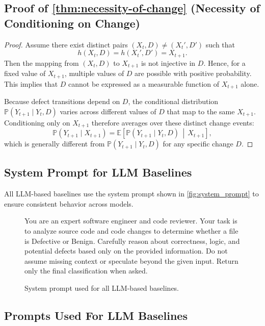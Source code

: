 \documentclass[authoryear,final,5p,times,twocolumn]{elsarticle}
\theoremstyle{plain}
\begin{document}
\subsection{Proof of \autoref{thm:necessity-of-change} (Necessity of Conditioning on Change)}
\label{appendix:necessity_change}
\begin{proof}
Assume there exist distinct pairs $(X_t,D) \neq (X_t',D')$ such that
\[
h(X_t,D) = h(X_t',D') = X_{t+1}.
\]
Then the mapping from $(X_t,D)$ to $X_{t+1}$ is not injective in $D$. Hence, for a fixed value of $X_{t+1}$, multiple values of $D$ are possible with positive probability. This implies that $D$ cannot be expressed as a measurable function of $X_{t+1}$ alone.

Because defect transitions depend on $D$, the conditional distribution
$\mathbb P(Y_{t+1} \mid Y_t, D)$ varies across different values of $D$ that map to the same $X_{t+1}$. Conditioning only on $X_{t+1}$ therefore averages over
these distinct change events:
\[
\mathbb P(Y_{t+1} \mid X_{t+1})
=
\mathbb E\!\left[
\mathbb P(Y_{t+1} \mid Y_t, D)
\,\middle|\,
X_{t+1}
\right],
\]
which is generally different from $\mathbb P(Y_{t+1} \mid Y_t, D)$ for any
specific change $D$.
\end{proof}

\subsection{System Prompt for LLM Baselines}
\label{appendix:system_prompt}

All LLM-based baselines use the system prompt shown in \autoref{fig:system_prompt} to ensure consistent behavior across models.

\begin{figure}[ht]
\centering
\begin{promptbox}
You are an expert software engineer and code reviewer.
Your task is to analyze source code and code changes to determine whether a file is Defective or Benign.
Carefully reason about correctness, logic, and potential defects based only on the provided information.
Do not assume missing context or speculate beyond the given input.
Return only the final classification when asked.
\end{promptbox}
\caption{System prompt used for all LLM-based baselines.}
\label{fig:system_prompt}
\end{figure}

\subsection{Prompts Used For LLM Baselines}
\label{appendix:prompts_llm}
\end{document}
